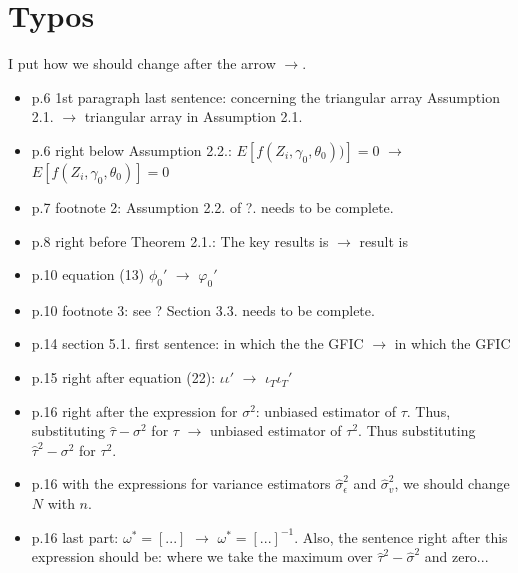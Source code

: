 \documentclass[11pt]{article}
\begin{document}



\doublespacing



\section*{Typos}

I put how we should change after the arrow $\rightarrow$. 

\begin{itemize}
\item p.6 1st paragraph last sentence: concerning the triangular array Assumption 2.1. $\rightarrow$ triangular array in Assumption 2.1. 
\item p.6 right below Assumption 2.2.: $E[f(Z_i, \gamma_0, \theta_0))]=0$ $\rightarrow$ $E[f(Z_i, \gamma_0, \theta_0)] = 0$
\item p.7 footnote 2: Assumption 2.2. of ?. needs to be complete.
\item p.8 right before Theorem 2.1.: The key results is $\rightarrow$ result is
\item p.10 equation (13) $\phi_0'$ $\rightarrow$ $\varphi_0'$
\item p.10 footnote 3: see ? Section 3.3. needs to be complete.
\item p.14 section 5.1. first sentence: in which the the GFIC $\rightarrow$ in which the GFIC 
\item p.15 right after equation (22): $\iota\iota'$ $\rightarrow$ $\iota_T \iota_T'$
\item p.16 right after the expression for $\sigma^2$: unbiased estimator of $\tau$. Thus, substituting $\widehat{\tau}-\sigma^2$ for $\tau$ $\rightarrow$ unbiased estimator of $\tau^2$. Thus substituting $\widehat{\tau}^2-\sigma^2$ for $\tau^2$. 
\item p.16 with the expressions for variance estimators $\widehat{\sigma}_\epsilon^2$ and $\widehat{\sigma}_v^2$, we should change $N$ with $n$. 
\item p.16 last part: $\omega^{*} = [...]$ $\rightarrow$ $\omega^{*} = [...]^{-1}$. Also, the sentence right after this expression should be: where we take the maximum over $\widehat{\tau}^2 - \widehat{\sigma}^2$ and zero...

\end{itemize}
\end{document}
